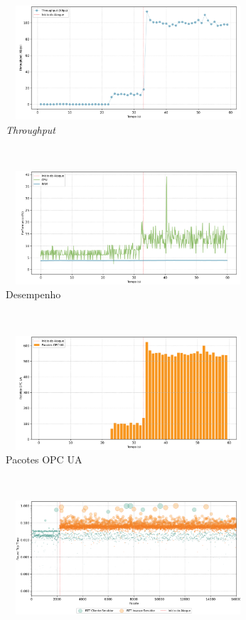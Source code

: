 \begin{apendicesenv}
\begin{figure}[htbp!]
    \centering
    \begin{subfigure}[t]{0.5\textwidth}
        \centering
        \includegraphics[width=1\textwidth, height=120pt]{USPSC-img/output/cropped/0-dos_open_multiple_secure_channels-tput.png}
        \caption{\textit{Throughput}}
    \end{subfigure}%
    ~ 
    \begin{subfigure}[t]{0.5\textwidth}
        \centering
        \includegraphics[width=1\textwidth, height=120pt]{USPSC-img/output/cropped/0-dos_open_multiple_secure_channels-perf.png}
        \caption{Desempenho}
    \end{subfigure}%
    \\
    \begin{subfigure}[t]{0.5\textwidth}
        \centering
        \includegraphics[width=1\textwidth, height=120pt]{USPSC-img/output/cropped/0-dos_open_multiple_secure_channels-pack.png}
        \caption{Pacotes OPC UA}
    \end{subfigure}%
    ~
    \begin{subfigure}[t]{0.5\textwidth}
        \centering
        \includegraphics[width=1\textwidth, height=120pt]{USPSC-img/output/cropped/0-dos_open_multiple_secure_channels-rttp.png}

\end{subfigure}
\end{figure}
\end{apendicesenv}
